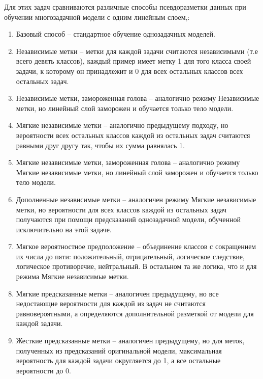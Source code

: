 Для этих задач сравниваются различные способы псевдоразметки данных при обучении многозадачной модели с одним линейным слоем,:
\begin{enumerate}
\item Базовый способ -- стандартное обучение однозадачных моделей.
\item Независимые метки -- метки для каждой задачи считаются независимыми (т.е всего девять классов), каждый пример имеет метку 1 для того класса своей задачи, к которому он принадлежит и 0 для всех остальных классов всех остальных задач. 
\item Независимые метки, замороженная голова -- аналогично режиму Независимые метки, но линейный слой заморожен и обучается только тело модели.
\item Мягкие независимые метки -- аналогично предыдущему подходу, но вероятности всех остальных классов каждой из остальных задач считаются равными друг другу так, чтобы их сумма равнялась 1. 
\item Мягкие независимые метки, замороженная голова -- аналогично режиму Мягкие независимые метки, но линейный слой заморожен и обучается только тело модели.
\item Дополненные независимые метки -- аналогичен режиму Мягкие независимые метки, но вероятности для всех классов каждой из остальных задач получаются при помощи предсказаний однозадачной модели, обученной исключительно на этой задаче.
\item Мягкое вероятностное предположение -- объединение классов с сокращением их числа до пяти: положительный, отрицательный, логическое следствие, логическое противоречие, нейтральный. В остальном та же логика, что и для режима Мягкие независимые метки.
\item Мягкие предсказанные метки -- аналогичен предыдущему, но все недостающие вероятности для каждой из задач не считаются равновероятными, а определяются дополнительной разметкой от модели для каждой задачи. 
\item Жесткие предсказанные метки -- аналогичен предыдущему, но для меток, полученных из предсказаний оригинальной модели, максимальная вероятность для каждой задачи округляется до 1, а все остальные вероятности до 0.
\end{enumerate}

